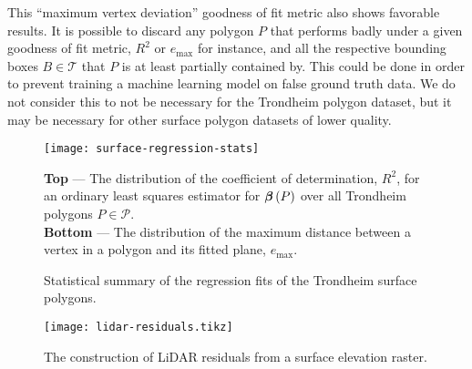 This \enquote{maximum vertex deviation} goodness of fit metric also shows favorable results.
It is possible to discard any polygon $P$ that performs badly under a given goodness of fit metric, $R^2$ or $e_{\mathrm{max}}$ for instance, and all the respective bounding boxes $B \in \mathcal{T}$ that $P$ is at least partially contained by.
This could be done in order to prevent training a machine learning model on false ground truth data.
We do not consider this to not be necessary for the Trondheim polygon dataset, but it may be necessary for other surface polygon datasets of lower quality.
%
\begin{figure}
  \texttt{[image: surface-regression-stats]}
  \caption{%
    Statistical summary of the regression fits of the Trondheim surface polygons.
  }{%
    \textbf{Top} --- The distribution of the coefficient of determination, $R^2$, for an ordinary least squares estimator for $\boldsymbol{\beta}\left(P\right)$ over all Trondheim polygons $P \in \mathcal{P}$.
    \\
    \textbf{Bottom} --- The distribution of the maximum distance between a vertex in a polygon and its fitted plane, $e_{\mathrm{max}}$.
  }%
  \label{fig:surface-regression-stats}
\end{figure}

\begin{figure}
  \centering
  \texttt{[image: lidar-residuals.tikz]}
  \caption{%
    The construction of LiDAR residuals from a surface elevation raster.
  }%
  \label{fig:lidar-residuals}
\end{figure}

